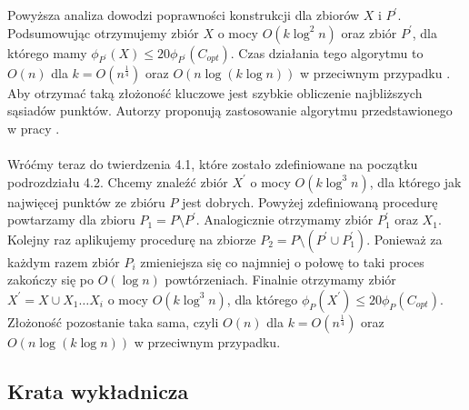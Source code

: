 \noindent
Powyższa analiza dowodzi poprawności konstrukcji dla zbiorów $X$ i $P^{'}$.
Podsumowując otrzymujemy zbiór $X$ o mocy $O(k \log^{2} n)$ oraz zbiór $P^{'}$, dla którego mamy $\phi_{P^{'}}(X) \leq 20\phi_{P^{'}}(C_{opt})$.
Czas działania tego algorytmu to $O(n)$ dla $k = O(n^{\frac{1}{4}})$ oraz $O(n \log (k \log n))$ w przeciwnym przypadku \cite{10.1145/1007352.1007400}.
Aby otrzymać taką złożoność kluczowe jest szybkie obliczenie najbliższych sąsiadów punktów.
Autorzy \cite{10.1145/1007352.1007400} proponują zastosowanie algorytmu przedstawionego w pracy \cite{10.1145/293347.293348}.
\\~\\
Wróćmy teraz do twierdzenia 4.1, które zostało zdefiniowane na początku podrozdziału 4.2.
Chcemy znaleźć zbiór $X^{'}$ o mocy $O(k \log^{3} n)$, dla którego jak najwięcej punktów ze zbióru $P$ jest dobrych.
Powyżej zdefiniowaną procedurę powtarzamy dla zbioru $P_{1} = P \setminus P^{'}$.
Analogicznie otrzymamy zbiór $P_{1}^{'}$ oraz $X_{1}$.
Kolejny raz aplikujemy procedurę na zbiorze $P_{2} = P \setminus (P^{'} \cup P_{1}^{'})$.
Ponieważ za każdym razem zbiór $P_{i}$ zmieniejsza się co najmniej o połowę to taki proces zakończy się po $O(\log n)$ powtórzeniach.
Finalnie otrzymamy zbiór $X^{'} = X \cup X_{1} \dots X_{i}$ o mocy $O(k \log^{3} n)$, dla którego $\phi_{P}(X^{'}) \leq 20\phi_{P}(C_{opt})$.
Złożoność pozostanie taka sama, czyli $O(n)$ dla $k = O(n^{\frac{1}{4}})$ oraz $O(n \log (k \log n))$ w przeciwnym przypadku.

\subsection{Krata wykładnicza}

